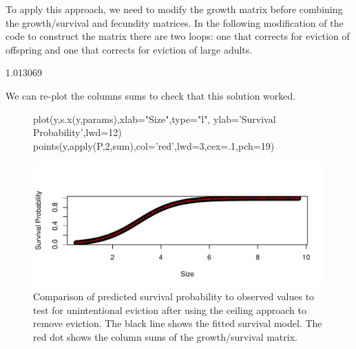 \documentclass[11pt]{article}
\begin{document}
To apply this approach, we need to modify the growth matrix before combining the growth/survival and fecundity matrices. In the following modification of the code to construct the matrix there are two loops: one that corrects for eviction of offspring and one that corrects for eviction of large adults.

\begin{Schunk}
\begin{Soutput}
[1] 1.013069
\end{Soutput}
\end{Schunk}

We can re-plot the columns sums to check that this solution worked. 

\begin{figure}[H]
\begin{center}
\begin{Schunk}
\begin{Sinput}
     plot(y,s.x(y,params),xlab="Size",type="l",
        ylab='Survival Probability',lwd=12)
     points(y,apply(P,2,sum),col='red',lwd=3,cex=.1,pch=19) 
\end{Sinput}
\end{Schunk}
\includegraphics{IPM_Guide_Appendix_A-fig_eviction_fix}
\caption{Comparison of predicted survival probability to observed values to test for unintentional eviction after using the ceiling approach to remove eviction. The black line shows the fitted survival model. The red dot shows the column sums of the growth/survival matrix.}
\label{fig:fig_eviction_fix}
\end{center}
\end{figure}
\end{document}
